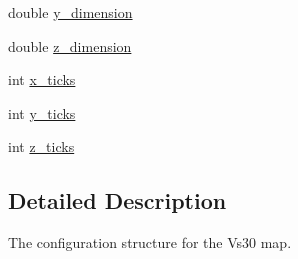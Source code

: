\begin{DoxyCompactItemize}
double \hyperlink{structcvms5__vs30__map__config__t_a703b4375d99324443cc34ea43542bdbd}{y\+\_\+dimension}
\item 
double \hyperlink{structcvms5__vs30__map__config__t_a1059fa7688dde557cad355af30910b8d}{z\+\_\+dimension}
\item 
int \hyperlink{structcvms5__vs30__map__config__t_a164065872d77b6ffa6e97ccac9aa02c5}{x\+\_\+ticks}
\item 
int \hyperlink{structcvms5__vs30__map__config__t_af7c4e61944fdbe7d6c7b0e53a71666e4}{y\+\_\+ticks}
\item 
int \hyperlink{structcvms5__vs30__map__config__t_af3bd0d454632e4b06041be797f400334}{z\+\_\+ticks}
\end{DoxyCompactItemize}


\subsection{Detailed Description}
The configuration structure for the Vs30 map. 

